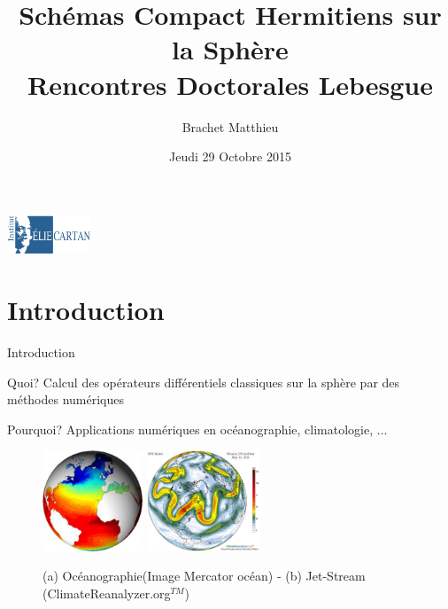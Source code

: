 \documentclass[11pt]{beamer}
\title{Schémas Compact Hermitiens sur la Sphère\\
Rencontres Doctorales Lebesgue}
\author{Brachet Matthieu}
\date[29.10.2015]{Jeudi 29 Octobre 2015}
\institute[IECL]{Institut Elie Cartan de Lorraine}
\begin{document}
\begin{frame}
\titlepage
\begin{center}
\includegraphics[width=2.5cm]{IECL.jpg}
\end{center}
\end{frame}

\begin{frame}
\tableofcontents
\end{frame}

\section{Introduction}
\begin{frame}{Introduction}

\begin{exampleblock}{Quoi?}
Calcul des opérateurs différentiels classiques sur la sphère par des méthodes numériques
\end{exampleblock}
\pause
\begin{exampleblock}{Pourquoi?}
Applications numériques en océanographie, climatologie, ...
\end{exampleblock}

\begin{figure}
\begin{center}
\includegraphics[height=3cm]{oceanographie.jpg}
\hspace{1cm}
\includegraphics[height=3cm]{climato.jpg}
\end{center}
\caption{(a) Océanographie(Image Mercator océan) - (b) Jet-Stream (ClimateReanalyzer.org$^{TM}$)}
\end{figure}

\end{frame}
\end{document}
